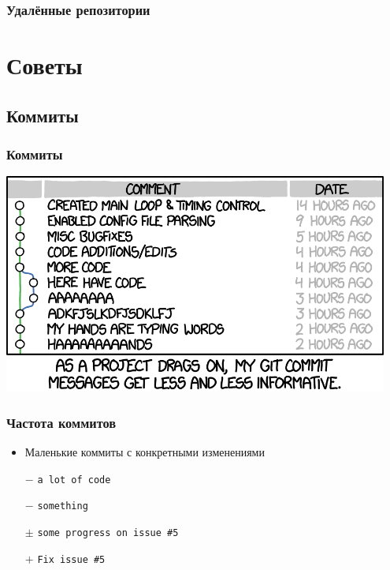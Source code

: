 \documentclass[pdf,russian]{beamer}
\begin{document}
\begin{frame}[fragile]
    \frametitle{Удалённые репозитории}
\end{frame}

\section{Советы}

\subsection{Коммиты}

\begin{frame}
    \frametitle{Коммиты}
    \pause
    \center
    \includegraphics[width=0.95\textwidth]{commits}
\end{frame}

\begin{frame}
    \frametitle{Частота коммитов}
    \begin{itemize}
        \item Маленькие коммиты с конкретными изменениями
        \pause
        \item[$-$] \texttt{a lot of code}
        \pause
        \item[$-$] \texttt{something}
        \pause
        \item[$\pm$] \texttt{some progress on issue \#{}5}
        \pause
        \item[$+$] \texttt{Fix issue \#{}5}
    \end{itemize}
\end{frame}
\end{document}
